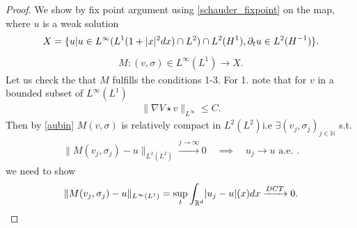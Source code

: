    \begin{proof}
     We show by fix point argument using \autoref{schauder_fixpoint} on the map, where 
 $u$ is a weak solution
    \begin{align*}
      X = \{u | u \in  L^{\infty}(L^{1}(1+\lvert x\rvert^2dx)  \cap L^2 )   \cap L^2(H^{1}), \partial_t u \in  L^2(H^{-1} )\} 
    .\end{align*}
    \begin{align*}
      M : (v,\sigma) \in  L^{\infty}(L^{1} ) \to X
    .\end{align*}
    Let us check the that $M$ fulfills the conditions 1-3.
    For 1. note that for $v $ in a bounded subset of $L^{\infty}(L^{1} ) $
    \begin{align*}
      \|\nabla V \star  v\|_{L^{\infty} }\le C
    .\end{align*}
    Then by \autoref{aubin} $M(v,\sigma )$ is relatively compact in  $L^{2}(L^{2} ) $i.e $\exists  (v_j,\sigma_j)_{j \in  \mathbb{N}}$ s.t.
\begin{align*}
  \|M(v_j,\sigma_j) - u \|_{L^{2}(L^{2})} \xrightarrow{j \to \infty} 0 \quad \implies \quad  u_j \to  u \text{ a.e. }
.\end{align*}
we need to show 
\begin{align*}
  \|M(v_j,\sigma_j) - u\|_{L^{\infty}(L^{1} ) }  = \sup_t \int_{\mathbb{R}^{d} } \lvert u_j - u\rvert(x) dx \xrightarrow{DCT}  0
.\end{align*}


\end{proof}
